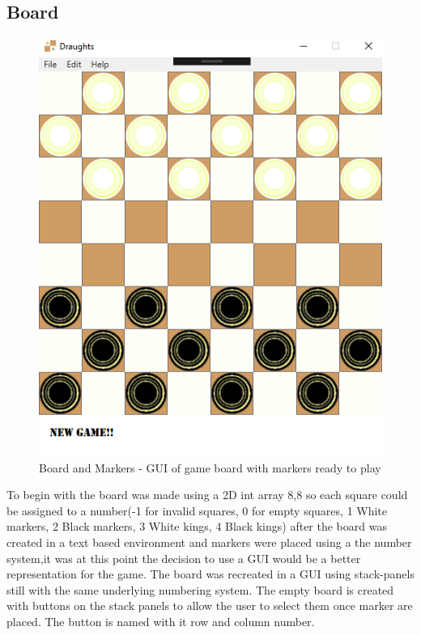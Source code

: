 \documentclass[10pt, a4paper]{article}
\begin{document}
	\subsection{Board}
	\begin{figure}[H]
  	\centering
  	\includegraphics[scale = 0.4]{board}
  	\caption{Board and Markers - GUI of game board with markers ready to play}
  	\label{fig:nonfloat}
	\end{figure}

	To begin with the board was made using a 2D int array 8,8 so each square could be assigned to a number(-1 for invalid squares, 0 for empty squares, 1 White markers, 2 Black markers, 3 White kings, 4 Black kings) after the board was created in a text based environment and markers were placed using a the number system,it was at this point the decision to use a GUI would be a better representation for the game. The board was recreated in a GUI using stack-panels still with the same underlying numbering system. The empty board is created with buttons on the stack panels to allow the user to select them once marker are placed. The button is named with it row and column number.
	
\end{document}
